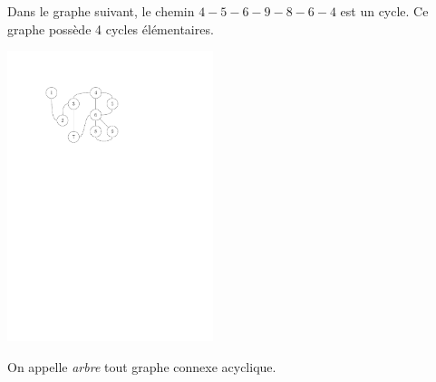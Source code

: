 \documentclass{magnolia}
\begin{document}
\begin{exempleUnique}
\exemple Dans le graphe suivant, le chemin $4- 5- 6- 9- 8- 6- 4$ est un cycle. Ce graphe possède 4 cycles élémentaires.
\begin{center}
  \includegraphics[width=6cm]{../../Commun/Images/python-cours-graphe-chemins-et-cycles.pdf}
\end{center}
\end{exempleUnique}

\begin{definition}
On appelle \emph{arbre} tout graphe connexe acyclique.
\end{definition}
\end{document}
